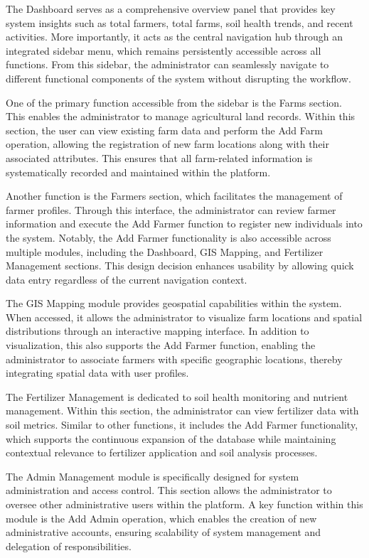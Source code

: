 {	The Dashboard serves as a comprehensive overview panel that provides key system insights such as total farmers, total farms, soil health trends, and recent activities. More importantly, it acts as the central navigation hub through an integrated sidebar menu, which remains persistently accessible across all functions. From this sidebar, the administrator can seamlessly navigate to different functional components of the system without disrupting the workflow.
	
	One of the primary function accessible from the sidebar is the Farms section. This enables the administrator to manage agricultural land records. Within this section, the user can view existing farm data and perform the Add Farm operation, allowing the registration of new farm locations along with their associated attributes. This ensures that all farm-related information is systematically recorded and maintained within the platform.
	
	Another function is the Farmers section, which facilitates the management of farmer profiles. Through this interface, the administrator can review farmer information and execute the Add Farmer function to register new individuals into the system. Notably, the Add Farmer functionality is also accessible across multiple modules, including the Dashboard, GIS Mapping, and Fertilizer Management sections. This design decision enhances usability by allowing quick data entry regardless of the current navigation context.
	
	The GIS Mapping module provides geospatial capabilities within the system. When accessed, it allows the administrator to visualize farm locations and spatial distributions through an interactive mapping interface. In addition to visualization, this also supports the Add Farmer function, enabling the administrator to associate farmers with specific geographic locations, thereby integrating spatial data with user profiles.
	
	The Fertilizer Management is dedicated to soil health monitoring and nutrient management. Within this section, the administrator can view fertilizer data with soil metrics. Similar to other functions, it includes the Add Farmer functionality, which supports the continuous expansion of the database while maintaining contextual relevance to fertilizer application and soil analysis processes.
	
	The Admin Management module is specifically designed for system administration and access control. This section allows the administrator to oversee other administrative users within the platform. A key function within this module is the Add Admin operation, which enables the creation of new administrative accounts, ensuring scalability of system management and delegation of responsibilities.
	
}
